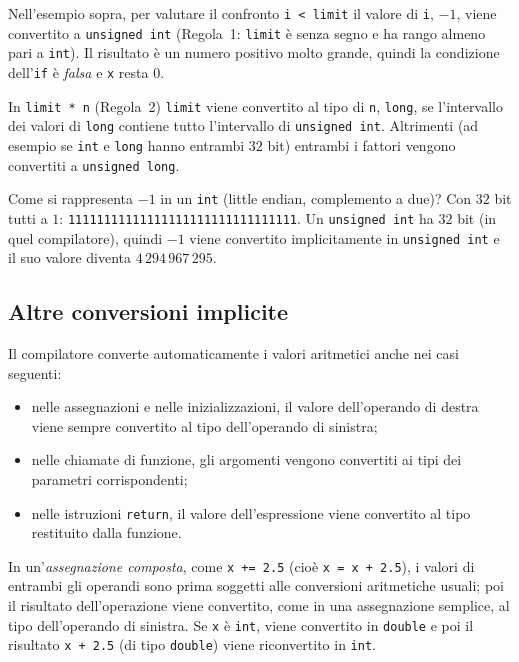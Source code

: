 \documentclass[11pt,a4paper]{article}
\begin{document}
\begin{esempio}
Nell'esempio sopra, per valutare il confronto \lstinline|i < limit| il valore di \lstinline|i|, $-1$, viene convertito a \lstinline|unsigned int| (Regola~1: \lstinline|limit| è senza segno e ha rango almeno pari a \lstinline|int|). Il risultato è un numero positivo molto grande, quindi la condizione dell'\lstinline|if| è \emph{falsa} e \lstinline|x| resta $0$.

In \lstinline|limit * n| (Regola~2) \lstinline|limit| viene convertito al tipo di \lstinline|n|, \lstinline|long|, se l'intervallo dei valori di \lstinline|long| contiene tutto l'intervallo di \lstinline|unsigned int|. Altrimenti (ad esempio se \lstinline|int| e \lstinline|long| hanno entrambi $32$ bit) entrambi i fattori vengono convertiti a \lstinline|unsigned long|.

Come si rappresenta $-1$ in un \lstinline|int| (little endian, complemento a due)? Con $32$ bit tutti a $1$: \texttt{11111111111111111111111111111111}. Un \lstinline|unsigned int| ha $32$ bit (in quel compilatore), quindi $-1$ viene convertito implicitamente in \lstinline|unsigned int| e il suo valore diventa $4\,294\,967\,295$.
\end{esempio}

\subsection{Altre conversioni implicite}

Il compilatore converte automaticamente i valori aritmetici anche nei casi seguenti:
\begin{itemize}
    \item nelle assegnazioni e nelle inizializzazioni, il valore dell'operando di destra viene sempre convertito al tipo dell'operando di sinistra;
    \item nelle chiamate di funzione, gli argomenti vengono convertiti ai tipi dei parametri corrispondenti;
    \item nelle istruzioni \lstinline|return|, il valore dell'espressione viene convertito al tipo restituito dalla funzione.
\end{itemize}

In un'\emph{assegnazione composta}, come \lstinline|x += 2.5| (cioè \lstinline|x = x + 2.5|), i valori di entrambi gli operandi sono prima soggetti alle conversioni aritmetiche usuali; poi il risultato dell'operazione viene convertito, come in una assegnazione semplice, al tipo dell'operando di sinistra. Se \lstinline|x| è \lstinline|int|, viene convertito in \lstinline|double| e poi il risultato \lstinline|x + 2.5| (di tipo \lstinline|double|) viene riconvertito in \lstinline|int|.
\end{document}
